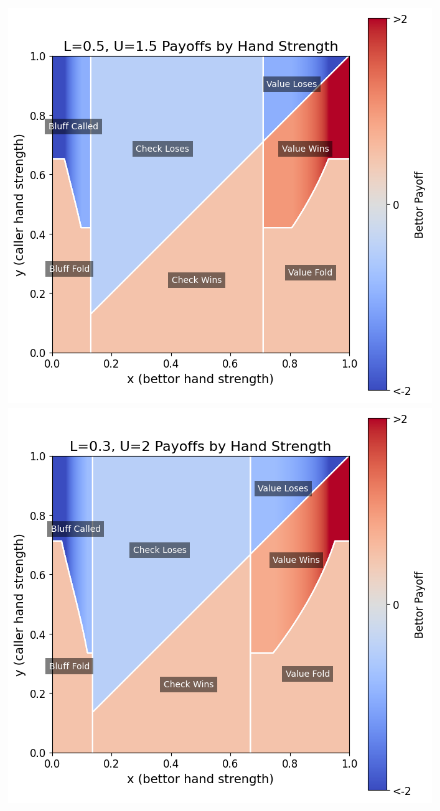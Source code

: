 \documentclass[../../main/main.tex]{subfiles}
\begin{document}
\begin{figure}[p]
\begin{adjustwidth}{-1.25in}{-1.25in}
\begin{minipage}{0.4\textwidth}
        \end{minipage}
        \vspace{0.4cm}\\
        \begin{minipage}{0.4\textwidth}
            \centering
            \includegraphics[width=\textwidth]{../payoff_analysis/images/payoffs_0.5_1.5.png}
        \end{minipage}
        \hspace{0.05\textwidth}
        \begin{minipage}{0.4\textwidth}
            \centering
            \includegraphics[width=\textwidth]{../payoff_analysis/images/payoffs_0.3_2.png}

\end{minipage}
\end{adjustwidth}
\end{figure}
\end{document}
